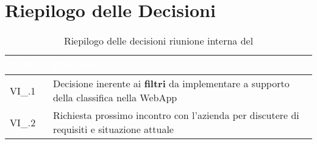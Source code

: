 \section{Riepilogo delle Decisioni}


\begin{table}[!htbp]
    \renewcommand{\arraystretch}{1.5}
    \begin{tabular}{m{}<{\centering}  m{}<{\centering}}
        \rowcolor{darkblue} \textcolor{white}{\textbf{Codice}} & \textcolor{white}{\textbf{Decisione}}                        \\
        \hline
        VI\_{}\D{}.1                                           & Decisione inerente ai \textbf{filtri} da implementare a supporto della classifica nella WebApp \\
        VI\_{}\D{}.2                                           & Richiesta prossimo incontro con l'azienda per discutere di requisiti e situazione attuale \\
    \end{tabular}
    \caption{Riepilogo delle decisioni riunione interna del \D}
\end{table}